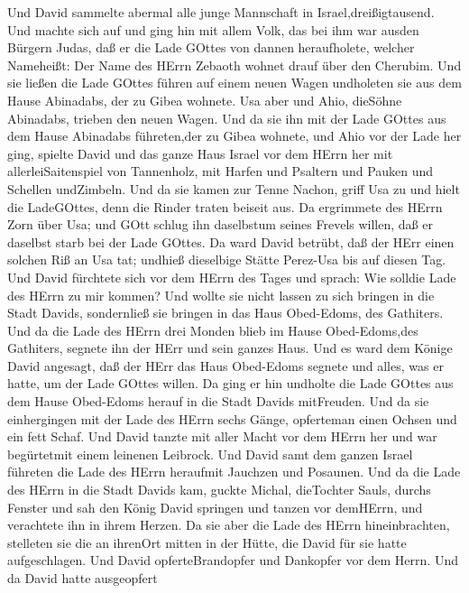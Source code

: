  Und David sammelte abermal alle junge Mannschaft in
Israel,dreißigtausend.  Und machte sich auf und ging hin mit
allem Volk, das bei ihm war ausden Bürgern Judas, daß er die Lade GOttes
von dannen heraufholete, welcher Nameheißt: Der Name des HErrn Zebaoth
wohnet drauf über den Cherubim.  Und sie ließen die Lade
GOttes führen auf einem neuen Wagen undholeten sie aus dem Hause
Abinadabs, der zu Gibea wohnete. Usa aber und Ahio, dieSöhne Abinadabs,
trieben den neuen Wagen.  Und da sie ihn mit der Lade GOttes
aus dem Hause Abinadabs führeten,der zu Gibea wohnete, und Ahio vor der
Lade her ging,  spielte David und das ganze Haus Israel vor
dem HErrn her mit allerleiSaitenspiel von Tannenholz, mit Harfen und
Psaltern und Pauken und Schellen undZimbeln.  Und da sie
kamen zur Tenne Nachon, griff Usa zu und hielt die LadeGOttes, denn die
Rinder traten beiseit aus.  Da ergrimmete des HErrn Zorn
über Usa; und GOtt schlug ihn daselbstum seines Frevels willen, daß er
daselbst starb bei der Lade GOttes.  Da ward David betrübt,
daß der HErr einen solchen Riß an Usa tat; undhieß dieselbige Stätte
Perez-Usa bis auf diesen Tag.  Und David fürchtete sich vor
dem HErrn des Tages und sprach: Wie solldie Lade des HErrn zu mir
kommen?  Und wollte sie nicht lassen zu sich bringen in die
Stadt Davids, sondernließ sie bringen in das Haus Obed-Edoms, des
Gathiters.  Und da die Lade des HErrn drei Monden blieb im
Hause Obed-Edoms,des Gathiters, segnete ihn der HErr und sein ganzes
Haus.  Und es ward dem Könige David angesagt, daß der HErr
das Haus Obed-Edoms segnete und alles, was er hatte, um der Lade GOttes
willen. Da ging er hin undholte die Lade GOttes aus dem Hause Obed-Edoms
herauf in die Stadt Davids mitFreuden.  Und da sie
einhergingen mit der Lade des HErrn sechs Gänge, opferteman einen Ochsen
und ein fett Schaf.  Und David tanzte mit aller Macht vor
dem HErrn her und war begürtetmit einem leinenen Leibrock. 
Und David samt dem ganzen Israel führeten die Lade des HErrn heraufmit
Jauchzen und Posaunen.  Und da die Lade des HErrn in die
Stadt Davids kam, guckte Michal, dieTochter Sauls, durchs Fenster und
sah den König David springen und tanzen vor demHErrn, und verachtete ihn
in ihrem Herzen.  Da sie aber die Lade des HErrn
hineinbrachten, stelleten sie die an ihrenOrt mitten in der Hütte, die
David für sie hatte aufgeschlagen. Und David opferteBrandopfer und
Dankopfer vor dem Herrn.  Und da David hatte ausgeopfert
